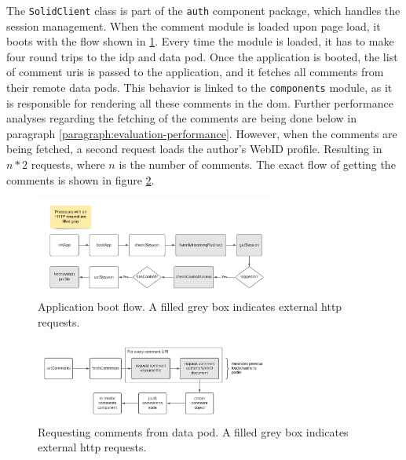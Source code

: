 The \texttt{SolidClient} class is part of the \texttt{auth} component package, which handles the session management. When the comment module is loaded upon page load, it boots with the flow shown in \ref{fig:poc-comment-flow-app_boot}. Every time the module is loaded, it has to make four round trips to the \gls{idp} and data pod. Once the application is booted, the list of comment \glspl{uri} is passed to the application, and it fetches all comments from their remote data pods. This behavior is linked to the \texttt{components} module, as it is responsible for rendering all these comments in the \gls{dom}. Further performance analyses regarding the fetching of the comments are being done below in paragraph \ref{paragraph:evaluation-performance}. However, when the comments are being fetched, a second request loads the author's WebID profile. Resulting in $n*2$ requests, where $n$ is the number of comments. The exact flow of getting the comments is shown in figure \ref{fig:poc-comment-flow-set_comments}.

\begin{figure}[H]
    \centering
    \includegraphics[width=0.7\textwidth]{prototype/graphs/poc-comment-flow-app_boot.png}
    \caption{Application boot flow. A filled grey box indicates external \gls{http} requests.}
    \label{fig:poc-comment-flow-app_boot}
\end{figure}

\begin{figure}[H]
    \centering
    \includegraphics[width=0.7\textwidth]{prototype/graphs/poc-comment-flow-set_comments.png}
    \caption{Requesting comments from data pod. A filled grey box indicates external \gls{http} requests.}
    \label{fig:poc-comment-flow-set_comments}
\end{figure}

